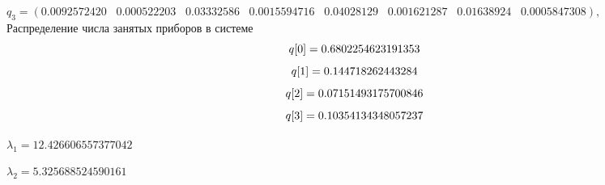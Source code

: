 \documentclass[12pt, a4paper]{article}
\begin{document}
$
q_3 = (0.0092572420   \;\;\;  0.000522203  \;\;\;   0.03332586   \;\;\;  0.0015594716  \;\;\;   0.04028129   \;\;\;  0.001621287  \;\;\;   0.01638924   \;\;\;  0.0005847308),
$\\



Распределение числа занятых приборов в системе
$$
q[0] = 0.6802254623191353\\
$$
$$
q[1] = 0.144718262443284\\
$$
$$
q[2] = 0.07151493175700846\\
$$
$$
q[3] = 0.10354134348057237\\
$$

$\lambda_1 = 12.426606557377042$

$\lambda_2 = 5.325688524590161$
\end{document}
